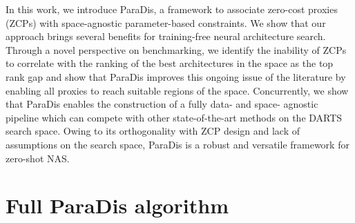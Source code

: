 \documentclass[10pt]{article} %
\begin{document}
In this work, we introduce ParaDis, a framework to associate zero-cost proxies (ZCPs) with space-agnostic parameter-based constraints. We show that our approach brings several benefits for training-free neural architecture search. Through a novel perspective on benchmarking, we identify the inability of ZCPs to correlate with the ranking of the best architectures in the space as the top rank gap and show that ParaDis improves this ongoing issue of the literature by enabling all proxies to reach suitable regions of the space. Concurrently, we show that ParaDis enables the construction of a fully data- and space- agnostic pipeline which can compete with other state-of-the-art methods on the DARTS search space. Owing to its orthogonality with ZCP design and lack of assumptions on the search space, ParaDis is a robust and versatile framework for zero-shot NAS.


\newpage




\newpage

\appendix

\section{Full ParaDis algorithm}
\label{apx_algorithm}
\end{document}
